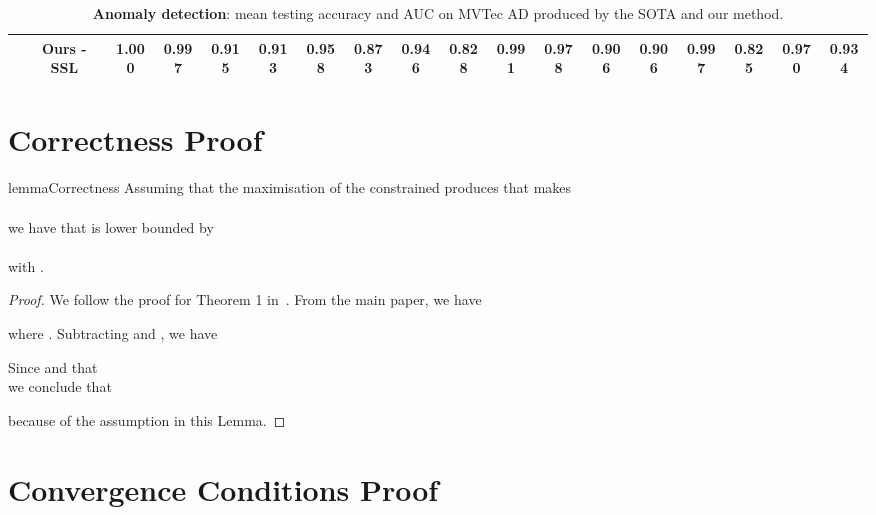 \documentclass[letterpaper]{article} \usepackage{aaai22}  \usepackage{times}  \usepackage{helvet}  \usepackage{courier}  \usepackage[hyphens]{url}  \usepackage{graphicx} \urlstyle{rm} \def\UrlFont{\rm}  \usepackage{natbib}  \usepackage{caption} \DeclareCaptionStyle{ruled}{labelfont=normalfont,labelsep=colon,strut=off} \frenchspacing  \setlength{\pdfpagewidth}{8.5in}  \setlength{\pdfpageheight}{11in}  \usepackage{algorithm}
\begin{document}
\begin{table*}[h]
{\begin{tabular}{@{}cccccccccccccccccc@{}}
         & \textbf{Ours - SSL}                                                 & {\textbf{1.000}}     & {\textbf{0.997}}    & {\textbf{0.915}}   & {\textbf{0.913}}     & {\textbf{0.958}}   & {\textbf{0.873}} & 0.946 & {\textbf{0.828 }} & {\textbf{0.991}} & {\textbf{0.978}} & {\textbf{0.906}} &{\textbf{0.906 }}     & {\textbf{0.997}}     & {\textbf{0.825}} & {\textbf{0.970 }}  & {\textbf{0.934}} \\ \bottomrule
\end{tabular}}
\caption{
\textbf{Anomaly detection}: mean testing accuracy and AUC on MVTec AD produced by the SOTA and our method.
}
\label{tab:auc_class_mvtec}
\end{table*}










\section{Correctness Proof}
\label{sec:correctness_analysis_proof}

\begin{restatable}[]{lemma}{Correctness}
    \label{thm:correctness}
    Assuming that the maximisation of the constrained  produces  that makes\\ 
    \scalebox{0.87}{
    ,} \\we have that 
    \scalebox{0.87}{} 
    is lower bounded by\\
    \scalebox{0.8}{
    ,} \\
    with .
 \end{restatable}

\begin{proof}
We follow the proof for Theorem 1 in~\citep{dempster1977maximum}. From the main paper, we have

where . Subtracting 
 and , we have

Since  and that
 \\
\scalebox{0.88}{
        ,} 
we conclude that 

because of the assumption in this Lemma.
\end{proof}



\section{Convergence Conditions Proof}
\label{sec:convergence_analysis_proof}
\end{document}

